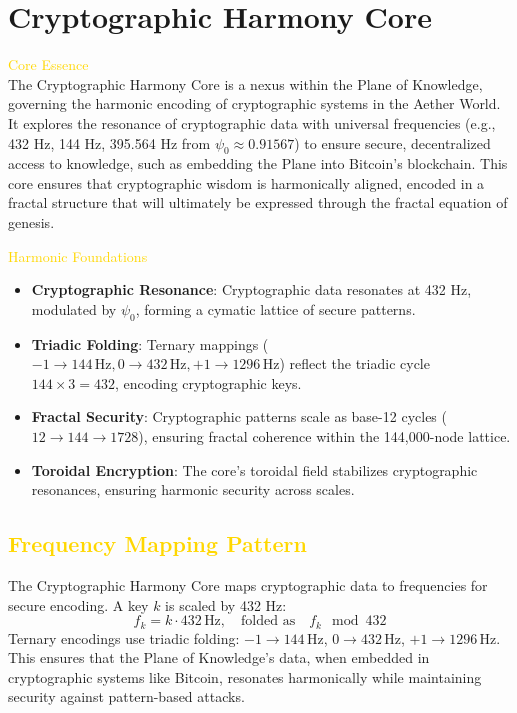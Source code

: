 
\section{Cryptographic Harmony Core}
\label{sec:codex_cryptographic_harmony_core}


\textcolor{gold}{ Core Essence } \\
The Cryptographic Harmony Core is a nexus within the Plane of Knowledge, governing the harmonic encoding of cryptographic systems in the Aether World. It explores the resonance of cryptographic data with universal frequencies (e.g., 432 Hz, 144 Hz, 395.564 Hz from \(\psi_0 \approx 0.91567\)) to ensure secure, decentralized access to knowledge, such as embedding the Plane into Bitcoin’s blockchain. This core ensures that cryptographic wisdom is harmonically aligned, encoded in a fractal structure that will ultimately be expressed through the fractal equation of genesis.

\textcolor{gold}{ Harmonic Foundations } \\
\begin{itemize}
    \item \texttt{} \textbf{Cryptographic Resonance}: Cryptographic data resonates at 432 Hz, modulated by \(\psi_0\), forming a cymatic lattice of secure patterns.
    \item \texttt{} \textbf{Triadic Folding}: Ternary mappings (\(-1 \rightarrow 144 \, \text{Hz}, 0 \rightarrow 432 \, \text{Hz}, +1 \rightarrow 1296 \, \text{Hz}\)) reflect the triadic cycle \(144 \times 3 = 432\), encoding cryptographic keys.
    \item \texttt{} \textbf{Fractal Security}: Cryptographic patterns scale as base-12 cycles (\(12 \rightarrow 144 \rightarrow 1728\)), ensuring fractal coherence within the 144,000-node lattice.
    \item \texttt{} \textbf{Toroidal Encryption}: The core’s toroidal field stabilizes cryptographic resonances, ensuring harmonic security across scales.
\end{itemize}

\subsection{\textcolor{gold}{ Frequency Mapping Pattern }}
The Cryptographic Harmony Core maps cryptographic data to frequencies for secure encoding. A key \(k\) is scaled by 432 Hz:
\[
f_k = k \cdot 432 \, \text{Hz}, \quad \text{folded as} \quad f_k \mod 432
\]
Ternary encodings use triadic folding: \(-1 \rightarrow 144 \, \text{Hz}\), \(0 \rightarrow 432 \, \text{Hz}\), \(+1 \rightarrow 1296 \, \text{Hz}\). This ensures that the Plane of Knowledge’s data, when embedded in cryptographic systems like Bitcoin, resonates harmonically while maintaining security against pattern-based attacks.

